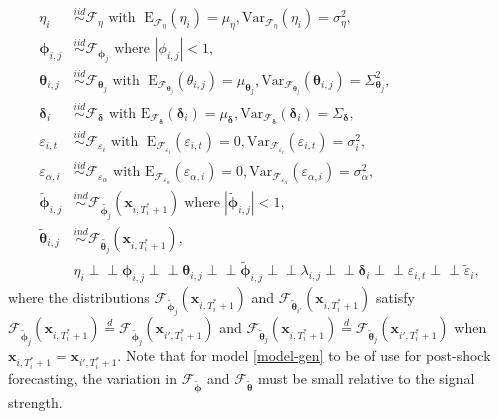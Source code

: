 \documentclass[11pt]{article}
\newcommand{\x}{\textbf{x}}
\newcommand{\simiid}{\stackrel{iid}{\sim}} %
\newcommand{\indep}{\perp \!\!\! \perp } %
\def\mrm#1{\mathrm{#1}} %
\def\t#1{\tilde{#1}} %
\def\mc#1{\mathcal{#1}} %
\def\mc#1{\mathcal{#1}}
\theoremstyle{definition}
\begin{document}
\begin{equation} \label{random-effects}
\begin{split}
  \eta_i &\simiid \mc{F}_{\eta} \text{ with }  \; \mrm{E}_{\mc{F}_{\eta}}(\eta_i) = \mu_\eta, \mrm{Var}_{\mc{F}_{\eta}}(\eta_i)  = \sigma^2_{\eta}, \\
  \mathbf{\phi}_{i,j} &\simiid \mc{F}_{\mathbf{\phi}_j} \text{ where } |\phi_{i,j}| < 1, \\
  \mathbf{\theta}_{i,j} &\simiid \mc{F}_{\mathbf{\theta}_j} \text{ with }  \; \mrm{E}_{\mc{F}_{\mathbf{\theta}_j}}(\theta_{i,j}) = \mu_{\mathbf{\theta}_j}, \mrm{Var}_{\mc{F}_{\mathbf{\theta}_j}}(\mathbf{\theta}_{i,j})  = \Sigma^2_{\mathbf{\theta}_j}, \\
  \mathbf{\delta}_i &\simiid  \mc{F}_{\mathbf{\delta}} \text{ with } \mrm{E}_{\mc{F}_{\mathbf{\delta}}}(\mathbf{\delta}_i)=\mu_{\mathbf{\delta}}, \mrm{Var}_{\mc{F}_{\mathbf{\delta}}}(\mathbf{\delta}_i)=\Sigma_{\mathbf{\delta}}, \\
\varepsilon_{i,t} & \simiid  \mc{F}_{\varepsilon_i} \text{ with }  \; \mrm{E}_{\mc{F}_{\varepsilon_i}}(\varepsilon_{i,t}) = 0, \mrm{Var}_{\mc{F}_{\varepsilon_i}}(\varepsilon_{i,t})  = \sigma^2_i,  \\
\varepsilon_{\alpha, i} &\simiid  \mc{F}_{\varepsilon_\alpha} \text{ with }\mrm{E}_{\mc{F}_{\varepsilon_\alpha}}(\varepsilon_{\alpha, i})=0, \mrm{Var}_{\mc{F}_{\varepsilon_{\alpha}}}(\varepsilon_{\alpha, i})=\sigma^2_{\alpha}, \\
  \tilde{\mathbf{\phi}}_{i,j} &\overset{ind}{\sim} \mathcal{F}_{\tilde{\mathbf{\phi}_j}}(\x_{i,T_i^*+1}) \; \text{where} \; |\tilde{\mathbf{\phi}}_{i,j}| < 1,  \\
  \tilde{\mathbf{\theta}}_{i,j} &\overset{ind}{\sim} \mathcal{F}_{\tilde{\mathbf{\theta}_j}}(\x_{i,T_i^*+1}),  \\  
&\eta_i \indep \mathbf{\phi}_{i,j} \indep \mathbf{\theta}_{i,j} \indep 
\tilde{\mathbf{\phi}}_{i,j} \indep \lambda_{i,j} \indep \mathbf{\delta}_i \indep \varepsilon_{i,t} \indep \tilde\varepsilon_{i}, 
\end{split}
\end{equation}
where the distributions $\mathcal{F}_{\tilde{\mathbf{\phi}}_j}(\x_{i,T_i^*+1})$ and $\mathcal{F}_{\tilde{\mathbf{\theta}}_{i'}}(\x_{i,T_i^*+1})$ satisfy $\mathcal{F}_{\tilde{\mathbf{\phi}}_j}(\x_{i,T_i^*+1}) \overset{d}{=} \mathcal{F}_{\tilde{\mathbf{\phi}}_{j}}(\x_{i',T_i^*+1})$ and $\mathcal{F}_{\tilde{\mathbf{\theta}}_j}(\x_{i,T_i^*+1}) \overset{d}{=} \mathcal{F}_{\tilde{\mathbf{\theta}}_{j}}(\x_{i',T_i^*+1})$ when $\x_{i,T_i^*+1} = \x_{i',T_i^*+1}$. Note that for model \eqref{model-gen} to be of use for post-shock forecasting, the variation in $\mathcal{F}_{\tilde{\mathbf{\phi}}}$ and $\mathcal{F}_{\tilde{\mathbf{\theta}}}$ must be small relative to the signal strength.
\end{document}
